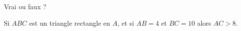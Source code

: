 
\begin{mental}
    
Vrai ou faux ?

Si \( ABC\) est un triangle rectangle en \( A\), et si \( AB=4\) et \( BC=10\) alors \( AC>8\).
\end{mental}

